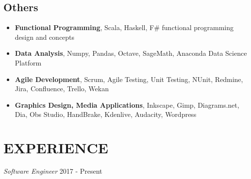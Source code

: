 \documentclass[line,margin]{res}
\begin{document}
\begin{resume}
                 \subsection{Others}
                 \begin{itemize}  \itemsep -2pt %
                   \item \textbf{Functional Programming}, Scala, Haskell, F\# functional programming design and concepts 
                   \item \textbf{Data Analysis}, Numpy, Pandas, Octave, SageMath, Anaconda Data Science Platform 
                   \item \textbf{Agile Development},  Scrum, Agile Testing, Unit Testing, NUnit, Redmine, Jira, Confluence, Trello, Wekan
                   \item \textbf{Graphics Design, Media Applications}, Inkscape, Gimp, Diagrams.net, Dia, Obs Studio, HandBrake, Kdenlive, Audacity, Wordpress
                 \end{itemize}
 
\section{EXPERIENCE} {\sl Software Engineer} \hfill  2017 - Present \\
                 \begin{itemize}  \itemsep -2pt %
               

\end{itemize}
\end{resume}
\end{document}
